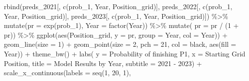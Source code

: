 \documentclass[
]{book}
\newenvironment{Shaded}{\begin{snugshade}}{\end{snugshade}}
\newcommand{\AttributeTok}[1]{\textcolor[rgb]{0.77,0.63,0.00}{#1}}
\newcommand{\DecValTok}[1]{\textcolor[rgb]{0.00,0.00,0.81}{#1}}
\newcommand{\FunctionTok}[1]{\textcolor[rgb]{0.00,0.00,0.00}{#1}}
\newcommand{\NormalTok}[1]{#1}
\newcommand{\SpecialCharTok}[1]{\textcolor[rgb]{0.00,0.00,0.00}{#1}}
\newcommand{\StringTok}[1]{\textcolor[rgb]{0.31,0.60,0.02}{#1}}
\begin{document}
\begin{Shaded}
\begin{Highlighting}[]
\FunctionTok{rbind}\NormalTok{(preds\_2021[, }\FunctionTok{c}\NormalTok{(}\StringTok{\textquotesingle{}prob\_1\textquotesingle{}}\NormalTok{, }\StringTok{\textquotesingle{}Year\textquotesingle{}}\NormalTok{, }\StringTok{\textquotesingle{}Position\_grid\textquotesingle{}}\NormalTok{)], }
\NormalTok{      preds\_2022[, }\FunctionTok{c}\NormalTok{(}\StringTok{\textquotesingle{}prob\_1\textquotesingle{}}\NormalTok{, }\StringTok{\textquotesingle{}Year\textquotesingle{}}\NormalTok{, }\StringTok{\textquotesingle{}Position\_grid\textquotesingle{}}\NormalTok{)], preds\_2023[, }\FunctionTok{c}\NormalTok{(}\StringTok{\textquotesingle{}prob\_1\textquotesingle{}}\NormalTok{, }\StringTok{\textquotesingle{}Year\textquotesingle{}}\NormalTok{, }\StringTok{\textquotesingle{}Position\_grid\textquotesingle{}}\NormalTok{)]) }\SpecialCharTok{\%\textgreater{}\%} 
  \FunctionTok{mutate}\NormalTok{(}\AttributeTok{pr =} \FunctionTok{exp}\NormalTok{(prob\_1),}
         \AttributeTok{Year =} \FunctionTok{factor}\NormalTok{(Year)) }\SpecialCharTok{\%\textgreater{}\%} 
  \FunctionTok{mutate}\NormalTok{( }\AttributeTok{pr =}\NormalTok{ pr }\SpecialCharTok{/}\NormalTok{ (}\DecValTok{1} \SpecialCharTok{+}\NormalTok{ pr)) }\SpecialCharTok{\%\textgreater{}\%} 
  \FunctionTok{ggplot}\NormalTok{(}\FunctionTok{aes}\NormalTok{(Position\_grid, }\AttributeTok{y =}\NormalTok{ pr, }\AttributeTok{group  =}\NormalTok{ Year, }\AttributeTok{col =}\NormalTok{ Year)) }\SpecialCharTok{+}
  \FunctionTok{geom\_line}\NormalTok{(}\AttributeTok{size =} \DecValTok{1}\NormalTok{) }\SpecialCharTok{+} 
  \FunctionTok{geom\_point}\NormalTok{(}\AttributeTok{size =} \DecValTok{2}\NormalTok{, }\AttributeTok{pch =} \DecValTok{21}\NormalTok{, }\AttributeTok{col =} \StringTok{\textquotesingle{}black\textquotesingle{}}\NormalTok{, }\FunctionTok{aes}\NormalTok{(}\AttributeTok{fill =}\NormalTok{ Year)) }\SpecialCharTok{+}
  \FunctionTok{theme\_bw}\NormalTok{() }\SpecialCharTok{+}
  \FunctionTok{labs}\NormalTok{( }\AttributeTok{y =} \StringTok{\textquotesingle{}Probability of finishing P1\textquotesingle{}}\NormalTok{,}
        \AttributeTok{x =} \StringTok{\textquotesingle{}Starting Grid Position\textquotesingle{}}\NormalTok{,}
        \AttributeTok{title =} \StringTok{\textquotesingle{}Model Results by Year\textquotesingle{}}\NormalTok{,}
        \AttributeTok{subtitle =} \StringTok{\textquotesingle{}2021 {-} 2023\textquotesingle{}}\NormalTok{) }\SpecialCharTok{+}
  \FunctionTok{scale\_x\_continuous}\NormalTok{(}\AttributeTok{labels =} \FunctionTok{seq}\NormalTok{(}\DecValTok{1}\NormalTok{, }\DecValTok{20}\NormalTok{, }\DecValTok{1}\NormalTok{),}

\end{Highlighting}
\end{Shaded}
\end{document}
